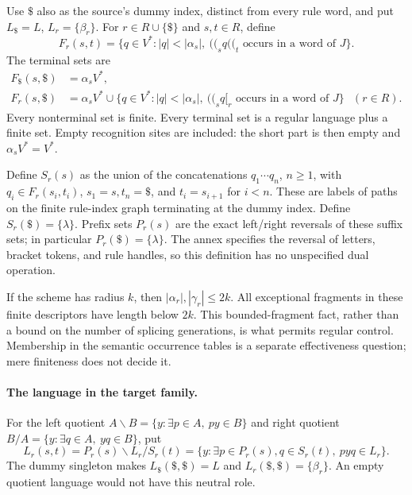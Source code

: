 Use \(\$\) also as the source's dummy index, distinct from every rule word,
and put \(L_\$=L\), \(L_r=\{\beta_r\}\).
For \(r\in R\cup\{\$\}\) and \(s,t\in R\), define
\[
 F_r(s,t)=\{q\in V^*:|q|<|\alpha_s|,
                    \ \mathopen{(\!(}_sq\mathopen{(\!(}_t\text{ occurs in a word of }J\}.
\]
The terminal sets are
\[
\begin{aligned}
 F_\$(s,\$)&=\alpha_sV^*,\\
 F_r(s,\$)&=\alpha_sV^*\cup
   \{q\in V^*:|q|<|\alpha_s|,
                    \ \mathopen{(\!(}_sq[_r\text{ occurs in a word of }J\}
                    &&(r\in R).
\end{aligned}
\]
Every nonterminal set is finite. Every terminal set is a regular language
plus a finite set. Empty recognition sites are included: the short part is
then empty and \(\alpha_sV^*=V^*\).

Define \(S_r(s)\) as the union of the concatenations
\(q_1\cdots q_n\), \(n\geq1\), with
\(q_i\in F_r(s_i,t_i)\), \(s_1=s,t_n=\$\), and
\(t_i=s_{i+1}\) for \(i<n\).
These are labels of paths on the finite rule-index graph terminating at
the dummy index. Define \(S_r(\$)=\{\lambda\}\).
Prefix sets \(P_r(s)\) are the exact left/right reversals of these suffix
sets; in particular \(P_r(\$)=\{\lambda\}\).
The annex specifies the reversal of letters, bracket tokens, and rule
handles, so this definition has no unspecified dual operation.

If the scheme has radius \(k\), then
\(|\alpha_r|,|\gamma_r|\leq2k\). All exceptional fragments in these
finite descriptors have length below \(2k\). This bounded-fragment fact,
rather than a bound on the number of splicing generations, is what
permits regular control. Membership in the semantic occurrence tables
is a separate effectiveness question; mere finiteness does not decide it.

\paragraph{The language in the target family.}
For the left quotient \(A\backslash B=\{y:\exists p\in A,\ py\in B\}\)
and right quotient \(B/A=\{y:\exists q\in A,\ yq\in B\}\), put
\[
 L_r(s,t)=P_r(s)\backslash L_r/S_r(t)
        =\{y:\exists p\in P_r(s),q\in S_r(t),\ pyq\in L_r\}.
\]
The dummy singleton makes \(L_\$(\$,\$)=L\) and
\(L_r(\$,\$)=\{\beta_r\}\). An empty quotient language would not have
this neutral role.

